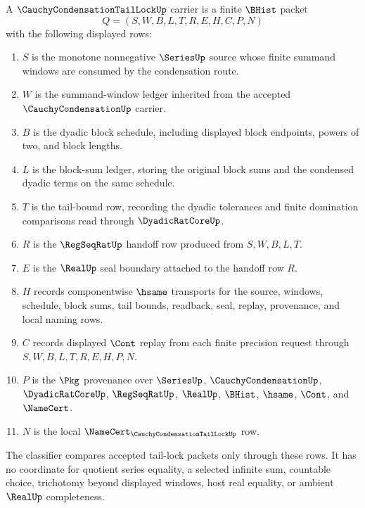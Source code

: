\begin{definition}
\label{def:cauchy-condensation-tail-lock-carrier}
A $\CauchyCondensationTailLockUp$ carrier is a finite $\BHist$ packet
$$
Q=(S,W,B,L,T,R,E,H,C,P,N)
$$
with the following displayed rows:
\begin{enumerate}
\item $S$ is the monotone nonnegative $\SeriesUp$ source whose finite summand windows are consumed by the condensation route.
\item $W$ is the summand-window ledger inherited from the accepted $\CauchyCondensationUp$ carrier.
\item $B$ is the dyadic block schedule, including displayed block endpoints, powers of two, and block lengths.
\item $L$ is the block-sum ledger, storing the original block sums and the condensed dyadic terms on the same schedule.
\item $T$ is the tail-bound row, recording the dyadic tolerances and finite domination comparisons read through $\DyadicRatCoreUp$.
\item $R$ is the $\RegSeqRatUp$ handoff row produced from $S,W,B,L,T$.
\item $E$ is the $\RealUp$ seal boundary attached to the handoff row $R$.
\item $H$ records componentwise $\hsame$ transports for the source, windows, schedule, block sums, tail bounds, readback, seal, replay, provenance, and local naming rows.
\item $C$ records displayed $\Cont$ replay from each finite precision request through $S,W,B,L,T,R,E,H,P,N$.
\item $P$ is the $\Pkg$ provenance over $\SeriesUp$, $\CauchyCondensationUp$, $\DyadicRatCoreUp$, $\RegSeqRatUp$, $\RealUp$, $\BHist$, $\hsame$, $\Cont$, and $\NameCert$.
\item $N$ is the local $\NameCert_{\CauchyCondensationTailLockUp}$ row.
\end{enumerate}
The classifier compares accepted tail-lock packets only through these rows. It has no coordinate for quotient series equality, a selected infinite sum, countable choice, trichotomy beyond displayed windows, host real equality, or ambient $\RealUp$ completeness.
\end{definition}

